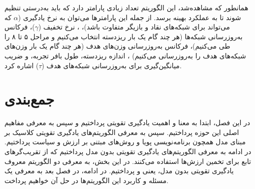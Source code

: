 همانطور که مشاهده‌شد، این الگوریتم تعداد زیادی پارامتر دارد که باید به‌درستی تنظیم شوند تا به عملکرد بهینه برسد.
از جمله این پارامتر‌ها می‌توان به نرخ یادگیری ($\alpha$ که می‌تواند برای شبکه‌های نقاد و بازیگر متفاوت باشد)،
، نرخ تخفیف ($\gamma$)،
فرکانس به‌روزرسانی شبکه‌ها (هر چند گام یک بار ریزدسته انتخاب می‌کنیم و مراحل ۵ تا ۸ را طی می‌کنیم)،
فرکانس به‌روزرسانی وزن‌های هدف (هر چند گام یک بار وزن‌های شبکه‌های هدف را به‌روزرسانی می‌کنیم)
 ، اندازه ریزدسته، طول بافر تجربه، و ضریب میانگین‌گیری برای به‌روزرسانی شبکه‌های هدف ($\tau$)
  اشاره کرد.
\section{جمع‌بندی}
در این فصل، ابتدا به معنا و اهمیت یادگیری تقویتی پرداختیم و سپس به معرفی مفاهیم اصلی این حوزه پرداختیم.
سپس به معرفی الگوریتم‌های یادگیری تقویتی کلاسیک بر مبنای مدل همچون برنامه‌نویسی پویا و روش‌های مبتنی بر ارزش و سیاست پرداختیم.
در ادامه به معرفی الگوریتم‌های یادگیری تقویتی بدون مدل پرداختیم که از تقریب‌گر‌های تابع برای تخمین ارزش‌ها استفاده می‌کنند.
در این بخش، به معرفی دو الگوریتم معروف یادگیری تقویتی بدون مدل، یعنی  و  پرداختیم.
در ادامه، در فصل بعد به معرفی یک مسئله و کاربرد این الگوریتم‌ها در حل آن خواهیم پرداخت.




